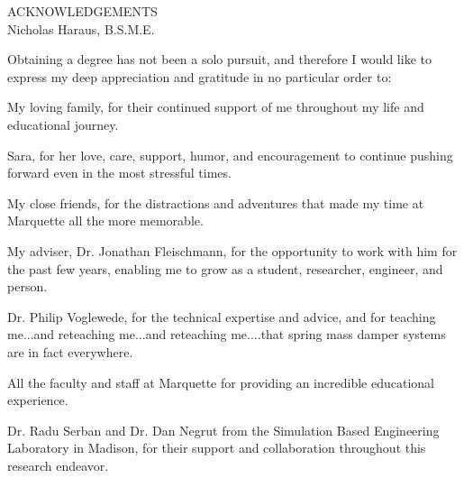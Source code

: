 \documentclass[12pt,onecolumn]{report}
\begin{document}
\setcounter{page}{1}
\begin{singlespacing}
\begin{centering}
ACKNOWLEDGEMENTS\\
\vspace{0.2in}
Nicholas Haraus, B.S.M.E.\\
\end{centering}
\vspace{0.2in}

Obtaining a degree has not been a solo pursuit, and therefore I would like to express my deep appreciation and gratitude in no particular order to:
\vspace{0.2in}

My loving family, for their continued support of me throughout my life and educational journey.


Sara, for her love, care, support, humor, and encouragement to continue pushing forward even in the most stressful times.


My close friends, for the distractions and adventures that made my time at Marquette all the more memorable.


My adviser, Dr. Jonathan Fleischmann, for the opportunity to work with him for the past few years, enabling me to grow as a student, researcher, engineer, and person. 


Dr. Philip Voglewede, for the technical expertise and advice, and for teaching me...and reteaching me...and reteaching me....that spring mass damper systems are in fact everywhere.


All the faculty and staff at Marquette for providing an incredible educational experience.


Dr. Radu Serban and Dr. Dan Negrut from the Simulation Based Engineering Laboratory in Madison, for their support and collaboration throughout this research endeavor. 

\end{singlespacing}

\begin{singlespace}
\newpage
\begingroup
\renewcommand{\vspace}[2]{}%
\tableofcontents
\endgroup




\newpage
\begingroup
\renewcommand{\vspace}[2]{}%
{}
\listoftables
\endgroup
\newpage
\begingroup
{}
\renewcommand{\vspace}[2]{}%
\listoffigures
\endgroup
\end{singlespace}
\end{document}
